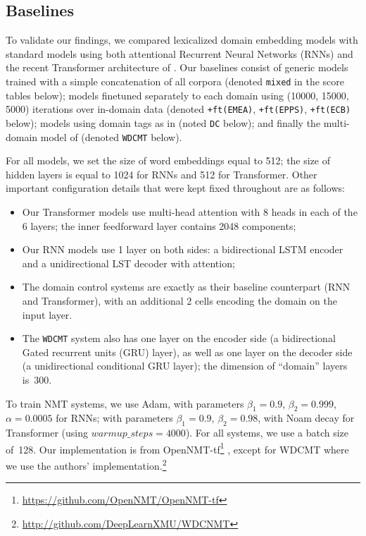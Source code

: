 \documentclass[11pt,a4paper]{article}
\newcommand{\fyTodo}[1]{\Todo[FY:]{\textcolor{orange}{#1}}}
\newcommand{\fyDone}[1]{\done[FY]\Todo[FY:]{\textcolor{orange}{#1}}}
\begin{document}
\subsection{Baselines \label{ssec:baselines}}
To validate our findings, we compared lexicalized domain embedding models with standard models using both attentional Recurrent Neural Networks (RNNs) \cite{Bahdanau15learning} and the recent Transformer architecture of \citet{Vaswani17attention}. Our baselines consist of generic models trained with a simple concatenation of all corpora (denoted \texttt{mixed} in the score tables below); models finetuned separately to each domain using (10000, 15000, 5000) iterations over in-domain data (denoted \texttt{+ft(EMEA)}, \texttt{+ft(EPPS)}, \texttt{+ft(ECB)} below); models using domain tags as in \cite{Kobus17domaincontrol} (noted \texttt{DC} below); and finally the multi-domain model of \citet{Zeng18multidomain} (denoted \texttt{WDCMT} below).\fyTodo{Change names in tables}

For all models, we set the size of word embeddings equal to 512; the size of hidden layers is equal to 1024 for RNNs and 512 for Transformer. Other important configuration details that were kept fixed throughout are as follows:
\fyDone{Improve this}
\begin{itemize}
\item Our Transformer models use multi-head attention with 8 heads in each of the 6 layers; the inner feedforward layer contains 2048 components; 
\item Our RNN models use 1 layer on both sides: a bidirectional LSTM encoder and a unidirectional LST decoder with attention;
\item The domain control systems are exactly as their baseline counterpart (RNN and Transformer), with an additional 2 cells encoding the domain on the input layer.\fyDone{Check This!}
\item The \texttt{WDCMT} system also has one layer on the encoder side (a bidirectional Gated recurrent units (GRU) layer), as well as one layer on the decoder side (a unidirectional conditional GRU layer); the dimension of ``domain'' layers is~300.
\end{itemize}
To train NMT systems, we use Adam, with parameters $\beta_1=0.9$, $\beta_2 = 0.999$, $\alpha=0.0005$ for RNNs; with parameters $\beta_1=0.9$, $\beta_2= 0.98$, with Noam decay \cite{Vaswani17attention} for Transformer (using $warmup\_steps=4000$). For all systems, we use a batch size of~128. Our implementation is from OpenNMT-tf\footnote{\url{https://github.com/OpenNMT/OpenNMT-tf}} \cite{Klein2017OpenNMT}, except for WDCMT where we use the authors' implementation.\footnote{\noindent\url{http://github.com/DeepLearnXMU/WDCNMT}}\fyDone{batch size}
\end{document}
